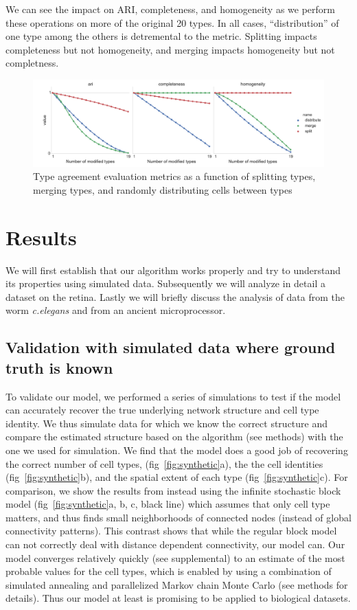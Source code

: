 \documentclass{article}
\begin{document}
We can see the impact on ARI, completeness, and homogeneity as we
perform these operations on more of the original 20 types. In all
cases, ``distribution'' of one type among the others is detremental to
the metric. Splitting impacts completeness but not homogeneity, and
merging impacts homogeneity but not completness.



\begin{figure}
  \centering 
  \centerline{\includegraphics[width=180mm]{cluster_metric_comparison.pdf}}
  \caption{Type agreement evaluation metrics as a function of splitting types, merging types, and randomly distributing cells between types}
  \label{fig:s:comparison}
\end{figure}


\section*{Results}
We will first establish that our algorithm works properly and try to
understand its properties using simulated data. Subsequently we will
analyze in detail a dataset on the retina. Lastly we will briefly
discuss the analysis of data from the worm \textit{c.elegans} and from
an ancient microprocessor.


\subsection*{Validation with simulated data where ground truth is known}
To validate our model, we performed a series of simulations to test if
the model can accurately recover the true underlying network structure
and cell type identity.  We thus simulate data for which we know the
correct structure and compare the estimated structure based on the
algorithm (see methods) with the one we used for simulation. We find
that the model does a good job of recovering the correct number of
cell types, (fig~\ref{fig:synthetic}a), the the cell identities
(fig~\ref{fig:synthetic}b), and the spatial extent of each type
(fig~\ref{fig:synthetic}c).  For comparison, we show the results from
instead using the infinite stochastic block model
(fig~\ref{fig:synthetic}a, b, c, black line) which assumes that only
cell type matters, and thus finds small neighborhoods of connected
nodes (instead of global connectivity patterns). This contrast shows
that while the regular block model can not correctly deal with
distance dependent connectivity, our model can. Our model converges
relatively quickly (see supplemental) to an estimate of the most
probable values for the cell types, which is enabled by using a
combination of simulated annealing and parallelized Markov chain Monte
Carlo (see methods for details). Thus our model at least is promising
to be applied to biological datasets.
\end{document}
